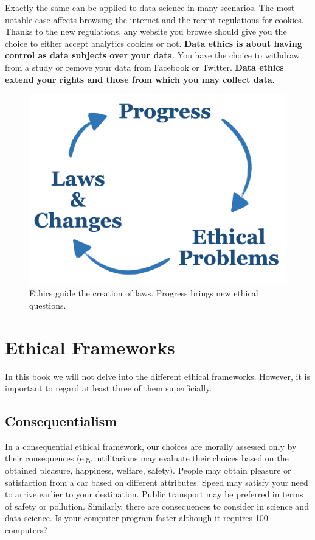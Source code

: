 \documentclass[
]{book}
\begin{document}
Exactly the same can be applied to data science in many scenarios. The most notable case affects browsing the internet and the recent regulations for cookies. Thanks to the new regulations, any website you browse should give you the choice to either accept analytics cookies or not. \textbf{Data ethics is about having control as data subjects over your data}. You have the choice to withdraw from a study or remove your data from Facebook or Twitter. \textbf{Data ethics extend your rights and those from which you may collect data}.

\begin{figure}

{\centering \includegraphics[width=0.33\linewidth]{Figures/ethics_cycle} 

}

\caption{Ethics guide the creation of laws. Progress brings new ethical questions.}\label{fig:ethics-cycle}
\end{figure}

\hypertarget{ethical-frameworks}{%
\section{Ethical Frameworks}\label{ethical-frameworks}}

In this book we will not delve into the different ethical frameworks. However, it is important to regard at least three of them superficially.

\hypertarget{consequentialism}{%
\subsection{Consequentialism}\label{consequentialism}}

In a consequential ethical framework, our choices are morally assessed only by their consequences (e.g.~utilitarians may evaluate their choices based on the obtained pleasure, happiness, welfare, safety). People may obtain pleasure or satisfaction from a car based on different attributes. Speed may satisfy your need to arrive earlier to your destination. Public transport may be preferred in terms of safety or pollution. Similarly, there are consequences to consider in science and data science. Is your computer program faster although it requires 100 computers?
\end{document}
